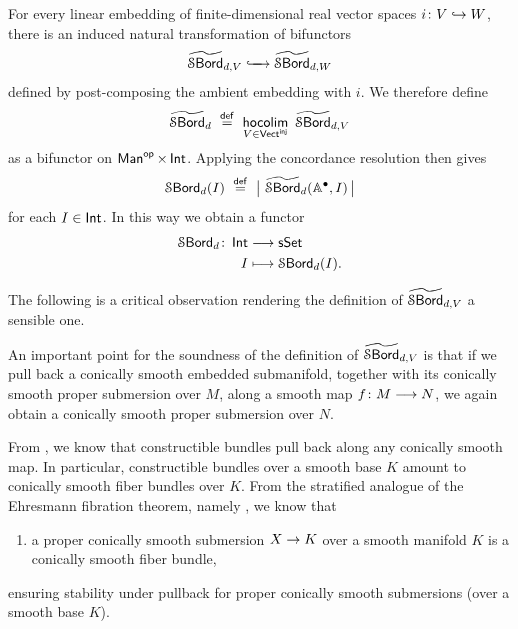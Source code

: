 \begin{observation}
    For every linear embedding of finite-dimensional real vector spaces $i\colon V \hookrightarrow W$, there is an induced natural transformation of bifunctors
    \begin{equation}
        \operatorname{\widetilde{\mathcal S\mathsf{Bord}}}_{d,V} \xhookrightarrow{\,\,\,\,\,\,\,\,} \operatorname{\widetilde{\mathcal S\mathsf{Bord}}}_{d,W}
    \end{equation}
    defined by post-composing the ambient embedding with $i$. We therefore define
    \begin{equation}
        \tilbordstr_{d} \,\, \overset{\sf def}{=} \,\, \hoColimit[V \in \vect^{\sf inj}]\,\tilbordstr_{d,V}
    \end{equation}
    as a bifunctor on $\operatorname{\sf Man}^{\mathsf{op}}\times \operatorname{\mathsf{Int}}$. Applying the concordance resolution then gives
    \begin{equation}
        \operatorname{\mathcal S\mathsf{Bord}}_{d}(I) \,\, \overset{\sf def}{=} \,\, \big|\,\operatorname{\widetilde{\mathcal S\mathsf{Bord}}}_{d}(\mathbb A^\bullet,I)\,\big|
    \end{equation}
    for each $I\in \operatorname{\mathsf{Int}}$. In this way we obtain a functor
    \begin{align}
        \operatorname{\mathcal S\mathsf{Bord}}_{d} \colon \operatorname{\mathsf{Int}} &\longrightarrow \operatorname{\sf sSet} \\
        I &\longmapsto \operatorname{\mathcal S\mathsf{Bord}}_d(I).
    \end{align}
 
\end{observation}

The following is a critical observation rendering the definition of $\operatorname{\widetilde{\mathcal S\mathsf{Bord}}}_{d,V}$ a sensible one.
\begin{observation}
    An important point for the soundness of the definition of $\operatorname{\widetilde{\mathcal S\mathsf{Bord}}}_{d,V}$ is that if we pull back a conically smooth embedded submanifold, together with its conically smooth proper submersion over $M$, along a smooth map $f\colon M \longrightarrow N$, we again obtain a conically smooth proper submersion over $N$.
    
    From , we know that constructible bundles pull back along any conically smooth map. In particular, constructible bundles over a smooth base $K$ amount to conically smooth fiber bundles over $K$. From the stratified analogue of the Ehresmann fibration theorem, namely , we know that 
    \begin{enumerate}
        \item[$(*)$] a proper conically smooth submersion $X \rightarrow K$ over a smooth manifold $K$ is a conically smooth fiber bundle, 
    \end{enumerate} 
    ensuring stability under pullback for proper conically smooth submersions (over a smooth base $K$).
\end{observation}

